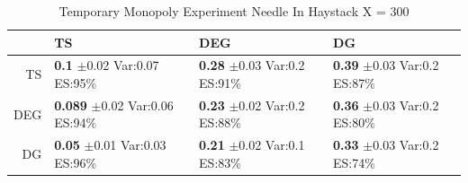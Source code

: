 \documentclass[11pt,letterpaper]{article}
\begin{document}
\begin{table}[H]
\centering
\caption{Temporary Monopoly Experiment Needle In Haystack X = 300} 
\begin{tabular}{rlll}
  \hline
 & TS & DEG &  DG \\ 
  \hline
TS & \makecell{\textbf{0.1} $\pm$0.02\\Var:0.07\\ES:95\%} & \makecell{\textbf{0.28} $\pm$0.03\\Var:0.2\\ES:91\%} & \makecell{\textbf{0.39} $\pm$0.03\\Var:0.2\\ES:87\%} \\ 
  DEG & \makecell{\textbf{0.089} $\pm$0.02\\Var:0.06\\ES:94\%} & \makecell{\textbf{0.23} $\pm$0.02\\Var:0.2\\ES:88\%} & \makecell{\textbf{0.36} $\pm$0.03\\Var:0.2\\ES:80\%} \\ 
   DG & \makecell{\textbf{0.05} $\pm$0.01\\Var:0.03\\ES:96\%} & \makecell{\textbf{0.21} $\pm$0.02\\Var:0.1\\ES:83\%} & \makecell{\textbf{0.33} $\pm$0.03\\Var:0.2\\ES:74\%} \\ 
   \hline
\end{tabular}
\end{table}
\end{document}
